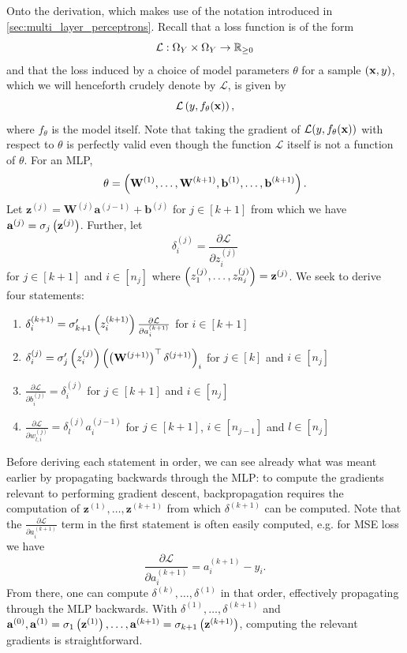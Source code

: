 \documentclass[11pt]{article}
\begin{document}
Onto the derivation, which makes use of the notation introduced in \autoref{sec:multi_layer_perceptrons}. Recall that a loss function is of the form
$$
\mathcal{L}:\Omega_{Y}\times\Omega_{Y}\to\mathbb{R}_{\geq0}
$$
and that the loss induced by a choice of model parameters $\theta$ for a sample $(\mathbf{x},y)$, which we will henceforth crudely denote by $\mathcal{L}$, is given by
$$
\mathcal{L}\left(y,f_{\theta}(\mathbf{x})\right),
$$
where $f_{\theta}$ is the model itself. Note that taking the gradient of $\mathcal{L}(y,f_{\theta}(\mathbf{x}))$ with respect to $\theta$ is perfectly valid even though the function $\mathcal{L}$ itself is not a function of $\theta$. For an MLP,
$$
\theta
=
\left(\mathbf{W}^{(1)},\dots,\mathbf{W}^{(k+1)},\mathbf{b}^{(1)},\dots,\mathbf{b}^{(k+1)}\right).
$$
Let $\mathbf{z}^{(j)}=\mathbf{W}^{(j)}\mathbf{a}^{(j-1)}+\mathbf{b}^{(j)}$ for $j\in[k+1]$ from which we have $\mathbf{a}^{(j)}=\sigma_{j}\left(\mathbf{z}^{(j)}\right)$. Further, let
$$
\delta^{(j)}_i
=
\frac{\partial\mathcal{L}}{\partial z^{(j)}_i}
$$
for $j\in[k+1]$ and $i\in[n_j]$ where $\left(z_1^{(j)},\dots,z_{n_j}^{(j)}\right)=\mathbf{z}^{(j)}$. We seek to derive four statements:
\begin{enumerate}
    \item $\delta_i^{(k+1)}=\sigma_{k+1}'\left(z_i^{(k+1)}\right)\frac{\partial\mathcal{L}}{\partial a_i^{(k+1)}}$ for $i\in[k+1]$
    \item $\delta_i^{(j)}=\sigma_{j}'\left(z_i^{(j)}\right)\left(\left(\mathbf{W}^{(j+1)}\right)^\top\delta^{(j+1)}\right)_i$ for $j\in[k]$ and $i\in[n_j]$
    \item $\frac{\partial\mathcal{L}}{\partial b^{(j)}_i}=\delta^{(j)}_i$ for $j\in[k+1]$ and $i\in[n_j]$
    \item $\frac{\partial\mathcal{L}}{\partial w_{l,i}^{(j)}}=\delta_l^{(j)}a_i^{(j-1)}$ for $j\in[k+1]$, $i\in[n_{j-1}]$ and $l\in[n_j]$
\end{enumerate}
Before deriving each statement in order, we can see already what was meant earlier by propagating backwards through the MLP: to compute the gradients relevant to performing gradient descent, backpropagation requires the computation of $\mathbf{z}^{(1)},\dots,\mathbf{z}^{(k+1)}$ from which $\delta^{(k+1)}$ can be computed. Note that the $\frac{\partial\mathcal{L}}{\partial a_i^{(k+1)}}$ term in the first statement is often easily computed, e.g. for MSE loss we have
$$
\frac{\partial\mathcal{L}}{\partial a_i^{(k+1)}}=a_i^{(k+1)}-y_i.
$$
From there, one can compute $\delta^{(k)},\dots,\delta^{(1)}$ in that order, effectively propagating through the MLP backwards. With $\delta^{(1)},\dots,\delta^{(k+1)}$ and $\mathbf{a}^{(0)},\mathbf{a}^{(1)}=\sigma_1\left(\mathbf{z}^{(1)}\right),\dots,\mathbf{a}^{(k+1)}=\sigma_{k+1}\left(\mathbf{z}^{(k+1)}\right)$, computing the relevant gradients is straightforward.\\
\end{document}

